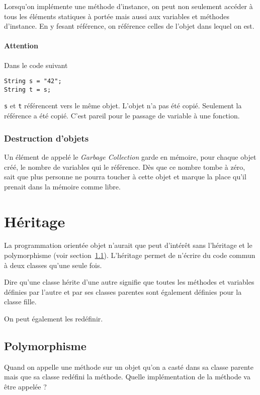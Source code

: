 Lorsqu'on implémente une méthode d'instance, on peut non seulement accéder
à tous les éléments statiques à portée mais aussi aux variables
et méthodes d'instance.
En y fesant référence, on référence celles de l'objet dans lequel on est.

\paragraph{Attention}
Dans le code suivant
\begin{lstlisting}
String s = "42";
String t = s;
\end{lstlisting}
\lstinline|s| et \lstinline|t| référencent vers le même objet.
L'objet n'a pas été copié.
Seulement la référence a été copié.
C'est pareil pour le passage de variable à une fonction.

\subsubsection{Destruction d'objets}
Un élément de \java{} appelé le \emph{Garbage Collection} garde en mémoire,
pour chaque objet créé, le nombre de variables qui le référence.
Dès que ce nombre tombe à zéro, \java{} sait que plus personne ne pourra
toucher à cette objet et marque la place qu'il prenait dans la mémoire
comme libre.

\section{Héritage}
La programmation orientée objet n'aurait que peut d'intérêt sans l'héritage
et le polymorphisme (voir section~\ref{sec:polymorphism}).
L'héritage permet de n'écrire du code commun à deux classes qu'une seule fois.

Dire qu'une classe hérite d'une autre signifie que toutes les méthodes
et variables définies par l'autre et par ses classes parentes sont également
définies pour la classe fille.

On peut également les redéfinir.

\subsection{Polymorphisme}
\label{sec:polymorphism}
Quand on appelle une méthode sur un objet qu'on a casté dans sa classe
parente mais que sa classe redéfini la méthode.
Quelle implémentation de la méthode va être appelée ?


